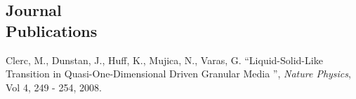 \documentclass[margin,line]{resume}
\begin{document}
\begin{resume}
    \section{\mysidestyle Journal\\Publications}
      \begin{bibenum}
        \item Clerc, M., Dunstan, J., Huff, K., Mujica, N., Varas, G. 
          ``Liquid-Solid-Like Transition in Quasi-One-Dimensional Driven 
          Granular Media '',  \textsl{Nature Physics}, Vol 4, 249 - 254, 2008.
      \end{bibenum}

\end{resume}
\end{document}
